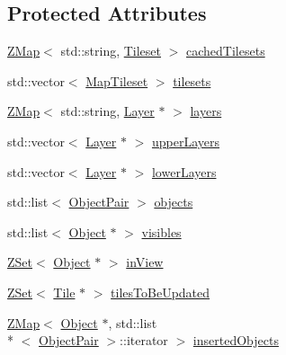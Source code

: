 \subsection*{Protected Attributes}
\begin{DoxyCompactItemize}
\item 
\hyperlink{namespaceZeta_a9af2e12c4e432d2a1725f19e5a648a04}{Z\+Map}$<$ std\+::string, \hyperlink{classZeta_1_1Tileset}{Tileset} $>$ \hyperlink{classZeta_1_1Map_aa4510662d56f1daac52bf382de75ad99}{cached\+Tilesets}
\item 
std\+::vector$<$ \hyperlink{structZeta_1_1Map_1_1MapTileset}{Map\+Tileset} $>$ \hyperlink{classZeta_1_1Map_a76a42ab4191ef49db6f59cc02a8a73b8}{tilesets}
\item 
\hyperlink{namespaceZeta_a9af2e12c4e432d2a1725f19e5a648a04}{Z\+Map}$<$ std\+::string, \hyperlink{classZeta_1_1Layer}{Layer} $\ast$ $>$ \hyperlink{classZeta_1_1Map_a0ad84eeb92c6849acf15de9c44adc9df}{layers}
\item 
std\+::vector$<$ \hyperlink{classZeta_1_1Layer}{Layer} $\ast$ $>$ \hyperlink{classZeta_1_1Map_ac88a82b8df86430865af9ad1a35f728c}{upper\+Layers}
\item 
std\+::vector$<$ \hyperlink{classZeta_1_1Layer}{Layer} $\ast$ $>$ \hyperlink{classZeta_1_1Map_ae6d4f933c620e45cd0c3d847b2ae336d}{lower\+Layers}
\item 
std\+::list$<$ \hyperlink{classZeta_1_1Map_1_1ObjectPair}{Object\+Pair} $>$ \hyperlink{classZeta_1_1Map_ad962606f526bd307b2949b2e40e4b7ab}{objects}
\item 
std\+::list$<$ \hyperlink{classZeta_1_1Object}{Object} $\ast$ $>$ \hyperlink{classZeta_1_1Map_a3b792a8851f4e9805ed5cc3afaec5399}{visibles}
\item 
\hyperlink{namespaceZeta_a92c229b4db6ab7275c2b7f32bdfabc87}{Z\+Set}$<$ \hyperlink{classZeta_1_1Object}{Object} $\ast$ $>$ \hyperlink{classZeta_1_1Map_af7ed558b80874484fa96cf3547852449}{in\+View}
\item 
\hyperlink{namespaceZeta_a92c229b4db6ab7275c2b7f32bdfabc87}{Z\+Set}$<$ \hyperlink{classZeta_1_1Tile}{Tile} $\ast$ $>$ \hyperlink{classZeta_1_1Map_a86f6145f0e835f7edcc000fc62b8d018}{tiles\+To\+Be\+Updated}
\item 
\hyperlink{namespaceZeta_a9af2e12c4e432d2a1725f19e5a648a04}{Z\+Map}$<$ \hyperlink{classZeta_1_1Object}{Object} $\ast$, std\+::list\\*
$<$ \hyperlink{classZeta_1_1Map_1_1ObjectPair}{Object\+Pair} $>$\+::iterator $>$ \hyperlink{classZeta_1_1Map_a7e96e8b33c42888db24f27559743970c}{inserted\+Objects}

\end{DoxyCompactItemize}
